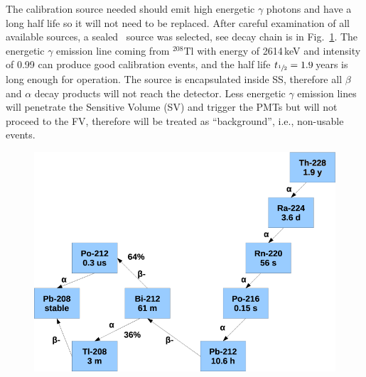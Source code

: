 The calibration source needed should emit high energetic $\gamma$ photons and have a long half life so it will not need to be replaced. After careful examination of all available sources, a sealed \Th\ source was selected, see decay chain is in Fig.~\ref{fig:th228}. The energetic $\gamma$ emission line coming from $^{208}\mathrm{Tl}$ with energy of 2614\,keV and intensity of 0.99 can produce good calibration events, and the half life $t_{\sfrac{1}{2}}=1.9$\,years is long enough for operation.
The source is encapsulated inside SS, therefore all $\beta$ and $\alpha$ decay products will not reach the detector. Less energetic $\gamma$ emission lines will penetrate the Sensitive Volume (SV) and trigger the PMTs but will not proceed to the FV, therefore will be treated as ``background'', i.e., non-usable events.



\begin{figure}
	\begin{center}
	\includegraphics[height= 0.5\textheight]{figs/Th228Check.PNG}%
		\label{fig:th228}		
		\end{center}
	
	\end{figure} 
 
